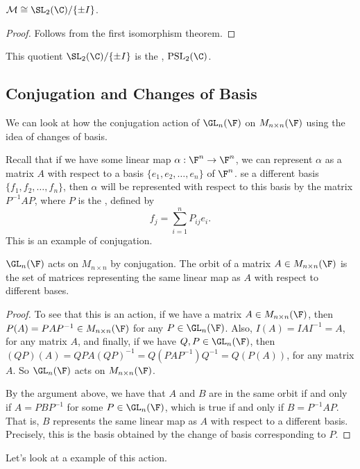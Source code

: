 \documentclass[a4paper]{scrartcl}
\newcommand{\newsection}{\subsection}
\begin{document}
\begin{corollary}
	$\mathcal{M} \cong \SL_2(\C) / \{\pm I\}$.
\end{corollary}
\begin{proof}
	Follows from the first isomorphism theorem.
\end{proof}

This quotient $\SL_2(\C) / \{\pm I\}$ is the , $\operatorname{PSL}_2(\C)$.


\newsection{Conjugation and Changes of Basis}

We can look at how the conjugation action of $\GL_{n} (\F)$ on $M_{n \times n}(\F)$ using the idea of changes of basis.

Recall that if we have some linear map $\alpha : \F^n \rightarrow \F^n$, we can represent $\alpha$ as a matrix $A$ with respect to a basis $\{e_1, e_2, \dots, e_n\}$ of $\F^n$.
se a different basis $\{f_1, f_2, \dots, f_n\}$, then $\alpha$ will be represented with respect to this basis by the matrix $P^{-1} A P$, where $P$ is the , defined by
$$
	f_j = \sum_{i = 1}^n P_{ij} e_i.
$$
This is an example of conjugation.

\begin{proposition}
	$\GL_n(\F)$ acts on $M_{n \times n}$ by conjugation. The orbit of a matrix $A \in M_{n \times n}(\F)$ is the set of matrices representing the same linear map as $A$ with respect to different bases.
\end{proposition}
\begin{proof}
	To see that this is an action, if we have a matrix $A \in M_{n \times n}(\F)$, then $P(A) = PAP^{-1} \in M_{n \times n}(\F)$ for any $P \in \GL_n(\F)$.
	Also, $I(A) = IAI^{-1} = A$, for any matrix $A$, and finally, if we have $Q, P \in \GL_n(\F)$, then $(QP)(A) = QPA (QP)^{-1} = Q(PAP^{-1})Q^{-1} = Q(P(A))$, for any matrix $A$.
	So $\GL_n(\F)$ acts on $M_{n \times n}(\F)$.

	By the argument above, we have that $A$ and $B$ are in the same orbit if and only if $A = PBP^{-1}$ for some $P \in \GL_n(\F)$, which is true if and only if $B = P^{-1}AP$.
	That is, $B$ represents the same linear map as $A$ with respect to a different basis. Precisely, this is the basis obtained by the change of basis corresponding to $P$.
\end{proof}

Let's look at a example of this action.
\end{document}

